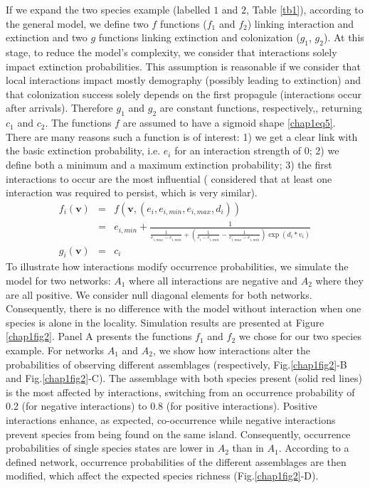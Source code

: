 If we expand the two species example (labelled $1$ and $2$, Table \ref{tb1}), according to the general model, we define two $f$ functions ($f_1$ and $f_2$) linking interaction and extinction and two $g$ functions linking extinction and colonization ($g_1$, $g_2$). At this stage, to reduce the model's complexity, we consider that interactions solely impact extinction probabilities. This assumption is reasonable if we consider that local interactions impact mostly demography (possibly leading to extinction) and that colonization success solely depends on the first propagule (interactions occur after arrivals). Therefore $g_1$ and $g_2$ are constant functions, respectively,, returning $c_1$ and $c_2$. The functions $f$ are assumed to have a sigmoid shape \eqref{chap1eq5}. There are many reasons such a function is of interest: 1) we get a clear link with the basic extinction probability, i.e. $e_i$ for an interaction strength of 0; 2) we define both a minimum and a maximum extinction probability; 3) the first interactions to occur are the most influential (\cite{Gravel2011} considered that at least one interaction was required to persist, which is very similar).
\begin{eqnarray}
\nonumber f_i(\mathbf{v})&=&f(\mathbf{v},(e_i,e_{i,min},e_{i,max},d_i)) \\
\label{chap1eq5} &=&e_{i,min}+\frac{1}{\frac{1}{e_{i,max}-e_{i,min}}+\left(\frac{1}{e_{i}-e_{i,min}}-\frac{1}{e_{i,max}-e_{i,min}}\right) \exp(d_i*v_i)}  \\
g_i(\mathbf{v})&=&c_i
\end{eqnarray}
To illustrate how interactions modify occurrence probabilities, we simulate the model for two networks: $A_1$ where all interactions are negative and $A_2$ where they are all positive. We consider null diagonal elements for both networks. Consequently, there is no difference with the model without interaction when one species is alone in the locality. Simulation results are presented at Figure \ref{chap1fig2}. Panel A presents the functions $f_1$ and $f_2$ we chose for our two species example. For networks $A_1$ and $A_2$, we show how interactions alter the probabilities of observing different assemblages (respectively, Fig.\ref{chap1fig2}-B and Fig.\ref{chap1fig2}-C). The assemblage with both species present (solid red lines) is the most affected by interactions, switching from an occurrence probability of 0.2 (for negative interactions) to 0.8 (for positive interactions). Positive interactions enhance, as expected, co-occurrence while negative interactions prevent species from being found on the same island. Consequently, occurrence probabilities of single species states are lower in $A_2$ than in $A_1$. According to a defined network, occurrence probabilities of the different assemblages are then modified, which affect the expected species richness (Fig.\ref{chap1fig2}-D).


